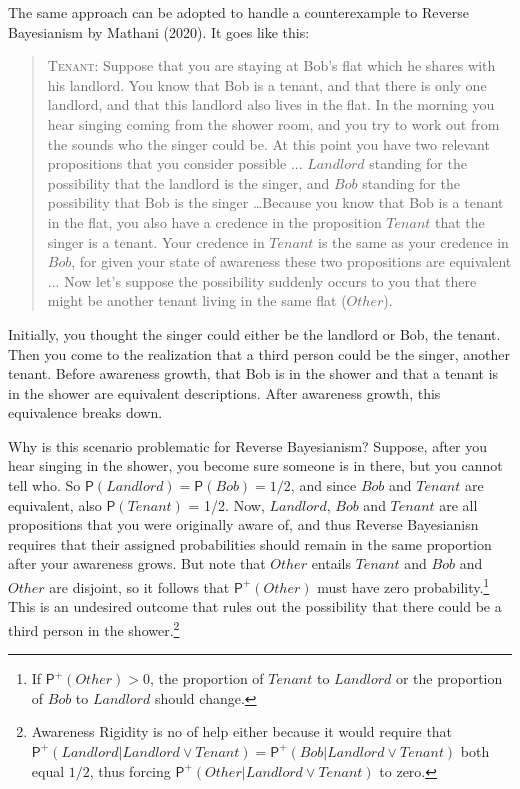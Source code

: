 \documentclass[
  11pt,
  dvipsnames,enabledeprecatedfontcommands]{scrartcl}
\newcommand{\pr}[1]{\ensuremath{\mathsf{P}(#1)}}
\newcommand{\ppr}[2]{\ensuremath{\mathsf{P}^{#1}(#2)}}
\begin{document}
The same approach can be adopted to handle a counterexample to Reverse
Bayesianism by Mathani (2020). It goes like this:

\begin{quote}
\textsc{Tenant}: Suppose that you are staying at Bob's flat which he shares with his landlord. You know
that Bob is a tenant, and that there is only one landlord, and that this landlord also
lives in the flat. In the morning you hear singing coming from the shower room, and
you try to work out from the sounds who the singer could be. At this point you have
two relevant propositions that you consider possible ... $Landlord$ standing for the possibility that the landlord is the singer, and $Bob$ standing for the possibility that Bob is the singer  \dots  Because you know that Bob is a tenant in the flat, you also have a credence in the proposition $Tenant$ that the singer is a tenant. Your credence in $Tenant$ is the same as your credence in $Bob$, for given your state of awareness these two propositions are equivalent ... Now let's suppose the possibility suddenly occurs to you that there might be another tenant living in the same flat  ($Other$).
\end{quote}

\doublespace

\noindent Initially, you thought the singer could either be the landlord
or Bob, the tenant. Then you come to the realization that a third person
could be the singer, another tenant. Before awareness growth, that Bob
is in the shower and that a tenant is in the shower are equivalent
descriptions. After awareness growth, this equivalence breaks down.

Why is this scenario problematic for Reverse Bayesianism? Suppose, after
you hear singing in the shower, you become sure someone is in there, but
you cannot tell who. So \(\pr{Landlord} = \pr{Bob} = 1/2\), and since
\(Bob\) and \(Tenant\) are equivalent, also \(\pr{Tenant}\) = 1/2. Now,
\(Landlord\), \(Bob\) and \(Tenant\) are all propositions that you were
originally aware of, and thus Reverse Bayesianisn requires that their
assigned probabilities should remain in the same proportion after your
awareness grows. But note that \(Other\) entails \(Tenant\) and \(Bob\)
and \(Other\) are disjoint, so it follows that \(\ppr{+}{Other}\) must
have zero probability.\footnote{If \(\ppr{+}{Other}>0\), the proportion
  of \(Tenant\) to \(Landlord\) or the proportion of \(Bob\) to
  \(Landlord\) should change.} This is an undesired outcome that rules
out the possibility that there could be a third person in the
shower.\footnote{Awareness Rigidity is no of help either because it
  would require that
  \(\ppr{+}{Landlord \vert Landlord \vee Tenant}=\ppr{+}{Bob \vert Landlord \vee Tenant}\)
  both equal \(1/2\), thus forcing
  \(\ppr{+}{Other \vert Landlord \vee Tenant}\) to zero.}
\end{document}
